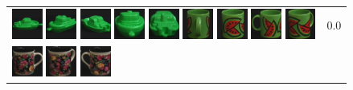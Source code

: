 \begin{figure}[tbp]
\begin{center}
\begin{tabular}{m{11cm} | m{3cm} |}
\includegraphics[width=1cm]{coil/beeld-55.eps}
\includegraphics[width=1cm]{coil/beeld-57.eps}
\includegraphics[width=1cm]{coil/beeld-58.eps}
\includegraphics[width=1cm]{coil/beeld-56.eps}
\includegraphics[width=1cm]{coil/beeld-59.eps}
\includegraphics[width=1cm]{coil/beeld-35.eps}
\includegraphics[width=1cm]{coil/beeld-32.eps}
\includegraphics[width=1cm]{coil/beeld-31.eps}
\includegraphics[width=1cm]{coil/beeld-33.eps}
& {\scriptsize 0.0}
\\
\includegraphics[width=1cm]{coil/beeld-60.eps}
\includegraphics[width=1cm]{coil/beeld-63.eps}
\includegraphics[width=1cm]{coil/beeld-61.eps}

\end{tabular}
\end{center}
\end{figure}
